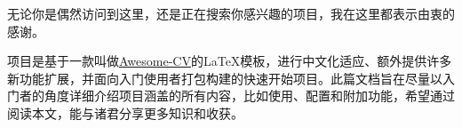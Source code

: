\makelettertitle\newline
\begin{cvletter}
{\hspace{2em}}无论你是偶然访问到这里，还是正在搜索你感兴趣的项目，我在这里都表示由衷的感谢。

{\hspace{2em}}{\dk}项目是基于一款叫做\hyperref{https://github.com/posquit0/Awesome-CV}{}{}{Awesome-CV}的{\LaTeX}模板，进行中文化适应、额外提供许多新功能扩展，并面向入门使用者打包构建的快速开始项目。此篇文档旨在尽量以入门者的角度详细介绍{\dk}项目涵盖的所有内容，比如使用、配置和附加功能，希望通过阅读本文，能与诸君分享更多知识和收获。
\end{cvletter}

\makeletterclosing\newline
\clearpage

